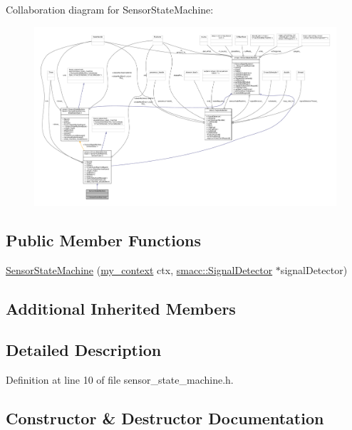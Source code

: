 Collaboration diagram for Sensor\+State\+Machine\+:
\nopagebreak
\begin{figure}[H]
\begin{center}
\leavevmode
\includegraphics[width=350pt]{structSensorStateMachine__coll__graph}
\end{center}
\end{figure}
\subsection*{Public Member Functions}
\begin{DoxyCompactItemize}
\item 
\hyperlink{structSensorStateMachine_ab923d35d47081f5a87b8cfab382c2b41}{Sensor\+State\+Machine} (\hyperlink{common_8h_af2dcacead80d69b96952496fe413bbfe}{my\+\_\+context} ctx, \hyperlink{classsmacc_1_1SignalDetector}{smacc\+::\+Signal\+Detector} $\ast$signal\+Detector)
\end{DoxyCompactItemize}
\subsection*{Additional Inherited Members}


\subsection{Detailed Description}


Definition at line 10 of file sensor\+\_\+state\+\_\+machine.\+h.



\subsection{Constructor \& Destructor Documentation}
